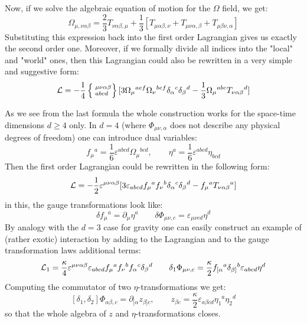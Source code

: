 \documentclass[a4paper,12pt]{article}
\begin{document}
Now, if we solve the algebraic equation of motion for the $\Omega$
field, we get:
\begin{equation}
\Omega_{\mu,\nu\alpha\beta} = \frac{2}{3} T_{\nu\alpha\beta,\mu} +
\frac{1}{3} [ T_{\mu\alpha\beta,\nu} + T_{\mu\nu\alpha,\beta} +
T_{\mu\beta\nu,\alpha} ]
\end{equation}
Substituting this expression back into the first order Lagrangian
gives us exactly the second order one. Moreover, if we formally
divide all indices into the "local" and "world" ones, then this
Lagrangian could also be rewritten in a very simple and suggestive
form:
\begin{equation}
{\cal L} = - \frac{1}{4} \left\{
\phantom{|}^{\mu\nu\alpha\beta}_{abcd}
\right\} [ 3 \Omega_\mu{}^{aef} \Omega_\nu{}^{bef} \delta_\alpha{}^c
\delta_\beta{}^d - \frac{1}{3} \Omega_\mu{}^{abc}
T_{\nu\alpha\beta}{}^d ]
\end{equation}

As we see from the last formula the whole construction works for the
space-time dimensions $d \ge 4$ only. In $d = 4$ (where
$\Phi_{\mu\nu,\alpha}$ does not describe any physical degrees of
freedom) one can introduce dual variables:
$$
f_\mu{}^a = \frac{1}{6} \varepsilon^{abcd} \Omega_\mu{}^{bcd}, \qquad
\eta^a = \frac{1}{6} \varepsilon^{abcd} \eta_{bcd}
$$
Then the first order Lagrangian could be rewritten in the following
form:
\begin{equation}
{\cal L} = - \frac{1}{2} \varepsilon^{\mu\nu\alpha\beta} [ 3
\varepsilon_{abcd} f_\mu{}^a f_\nu{}^b \delta_\alpha{}^c
\delta_\beta{}^d - f_\mu{}^a T_{\nu\alpha\beta}{}^a ]
\end{equation}
in this, the gauge transformations look like:
$$
\delta f_\mu{}^a = \partial_\mu \eta^a \qquad \delta \Phi_{\mu\nu,c} =
\varepsilon_{\mu\nu cd} \eta^d
$$
By analogy with the $d=3$ case for gravity one can easily construct
an example of (rather exotic) interaction by adding to the Lagrangian
and to the gauge transformation laws additional terms:
\begin{equation}
{\cal L}_1 = \frac{\kappa}{4} \varepsilon^{\mu\nu\alpha\beta}
\varepsilon_{abcd} f_\mu{}^a f_\nu{}^b f_\alpha{}^c \delta_\beta{}^d
\qquad \delta_1 \Phi_{\mu\nu,c} = \frac{\kappa}{2} f_{[\alpha}{}^a
\delta_{\beta]}{}^b \varepsilon_{abcd} \eta^d
\end{equation}
Computing the commutator of two $\eta$-transformations we get:
$$
[\delta_1, \delta_2] \Phi_{\alpha\beta,c} = \partial_{[\alpha}
z_{\beta]c}, \qquad z_{\beta c} = \frac{\kappa}{2}
\varepsilon_{a\beta cd} \eta_1{}^a \eta_2{}^d
$$
so that the whole algebra of $z$ and $\eta$-transformations
closes.
\end{document}
